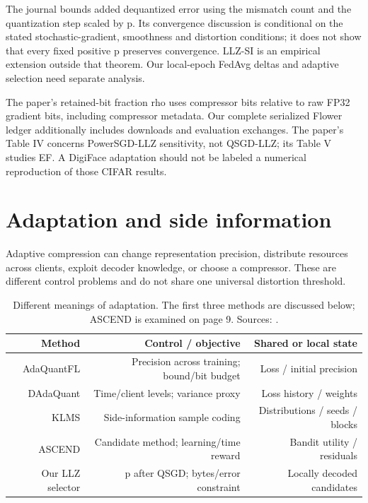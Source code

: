 The journal bounds added dequantized error using the mismatch count and the quantization step scaled by p. Its convergence discussion is conditional on the stated stochastic-gradient, smoothness and distortion conditions; it does not show that every fixed positive p preserves convergence. LLZ-SI is an empirical extension outside that theorem. Our local-epoch FedAvg deltas and adaptive selection need separate analysis. \parencite{cao2026llz}

The paper's retained-bit fraction rho uses compressor bits relative to raw FP32 gradient bits, including compressor metadata. Our complete serialized Flower ledger additionally includes downloads and evaluation exchanges. The paper's Table IV concerns PowerSGD-LLZ sensitivity, not QSGD-LLZ; its Table V studies EF. A DigiFace adaptation should not be labeled a numerical reproduction of those CIFAR results.

\section{Adaptation and side information}

Adaptive compression can change representation precision, distribute resources across clients, exploit decoder knowledge, or choose a compressor. These are different control problems and do not share one universal distortion threshold.

\begin{table}[htbp]
\centering
\small
\begin{tabularx}{\textwidth}{R{0.69000}R{1.41000}R{0.90000}}
\toprule
\textbf{Method} & \textbf{Control / objective} & \textbf{Shared or local state} \\\midrule
AdaQuantFL & Precision across training; bound/bit budget & Loss / initial precision \\
DAdaQuant & Time/client levels; variance proxy & Loss history / weights \\
KLMS & Side-information sample coding & Distributions / seeds / blocks \\
ASCEND & Candidate method; learning/time reward & Bandit utility / residuals \\
Our LLZ selector & p after QSGD; bytes/error constraint & Locally decoded candidates \\
\bottomrule
\end{tabularx}
\caption{Different meanings of adaptation. The first three methods are discussed below; ASCEND is examined on page 9. Sources: \parencite{jhunjhunwala2021adaquantfl,honig2022dadaquant,isik2024sideinformation,liu2026ascend}.}
\label{tab:adaptive}
\end{table}

